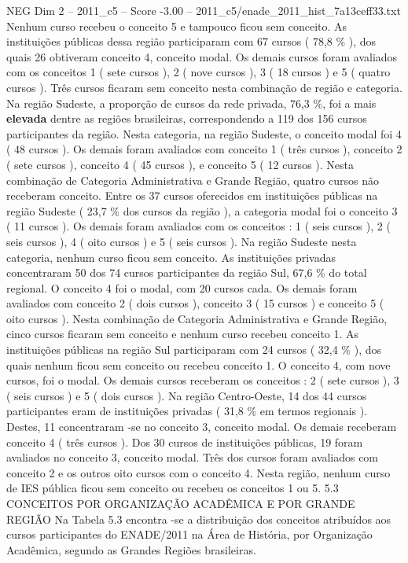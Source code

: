 \begin{textsample}{NEG Dim 2 – 2011\_c5 – Score -3.00 – 2011\_c5/enade\_2011\_hist\_7a13ceff33.txt}
Nenhum curso recebeu o conceito 5 e tampouco ficou sem conceito.
As instituições públicas dessa região participaram com 67 cursos ( 78,8 \% ), dos quais 26 obtiveram conceito 4, conceito modal.
Os demais cursos foram avaliados com os conceitos 1 ( sete cursos ), 2 ( nove cursos ), 3 ( 18 cursos ) e 5 ( quatro cursos ).
Três cursos ficaram sem conceito nesta combinação de região e categoria.
Na região Sudeste, a proporção de cursos da rede privada, 76,3 \%, foi a mais \textbf{elevada} dentre as regiões brasileiras, correspondendo a 119 dos 156 cursos participantes da região.
Nesta categoria, na região Sudeste, o conceito modal foi 4 ( 48 cursos ).
Os demais foram avaliados com conceito 1 ( três cursos ), conceito 2 ( sete cursos ), conceito 4 ( 45 cursos ), e conceito 5 ( 12 cursos ).
Nesta combinação de Categoria Administrativa e Grande Região, quatro cursos não receberam conceito.
Entre os 37 cursos oferecidos em instituições públicas na região Sudeste ( 23,7 \% dos cursos da região ), a categoria modal foi o conceito 3 ( 11 cursos ).
Os demais foram avaliados com os conceitos : 1 ( seis cursos ), 2 ( seis cursos ), 4 ( oito cursos ) e 5 ( seis cursos ).
Na região Sudeste nesta categoria, nenhum curso ficou sem conceito.
As instituições privadas concentraram 50 dos 74 cursos participantes da região Sul, 67,6 \% do total regional.
O conceito 4 foi o modal, com 20 cursos cada.
Os demais foram avaliados com conceito 2 ( dois cursos ), conceito 3 ( 15 cursos ) e conceito 5 ( oito cursos ).
Nesta combinação de Categoria Administrativa e Grande Região, cinco cursos ficaram sem conceito e nenhum curso recebeu conceito 1.
As instituições públicas na região Sul participaram com 24 cursos ( 32,4 \% ), dos quais nenhum ficou sem conceito ou recebeu conceito 1.
O conceito 4, com nove cursos, foi o modal.
Os demais cursos receberam os conceitos : 2 ( sete cursos ), 3 ( seis cursos ) e 5 ( dois cursos ).
Na região Centro-Oeste, 14 dos 44 cursos participantes eram de instituições privadas ( 31,8 \% em termos regionais ).
Destes, 11 concentraram -se no conceito 3, conceito modal.
Os demais receberam conceito 4 ( três cursos ).
Dos 30 cursos de instituições públicas, 19 foram avaliados no conceito 3, conceito modal.
Três dos cursos foram avaliados com conceito 2 e os outros oito cursos com o conceito 4.
Nesta região, nenhum curso de IES pública ficou sem conceito ou recebeu os conceitos 1 ou 5. 5.3 CONCEITOS POR ORGANIZAÇÃO ACADÊMICA E POR GRANDE REGIÃO Na Tabela 5.3 encontra -se a distribuição dos conceitos atribuídos aos cursos participantes do ENADE/2011 na Área de História, por Organização Acadêmica, segundo as Grandes Regiões brasileiras.

\end{textsample}
